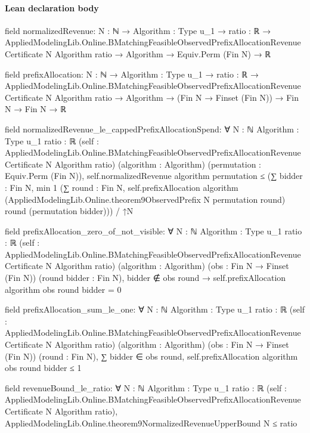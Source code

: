 \documentclass[10pt]{article}
\begin{document}
\paragraph{Lean declaration body}
\begin{ReviewVerbatim}
field normalizedRevenue:
{N : ℕ} →
  {Algorithm : Type u_1} →
    {ratio : ℝ} →
      AppliedModelingLib.Online.BMatchingFeasibleObservedPrefixAllocationRevenueCertificate N Algorithm ratio →
        Algorithm → Equiv.Perm (Fin N) → ℝ

field prefixAllocation:
{N : ℕ} →
  {Algorithm : Type u_1} →
    {ratio : ℝ} →
      AppliedModelingLib.Online.BMatchingFeasibleObservedPrefixAllocationRevenueCertificate N Algorithm ratio →
        Algorithm → (Fin N → Finset (Fin N)) → Fin N → Fin N → ℝ

field normalizedRevenue_le_cappedPrefixAllocationSpend:
∀ {N : ℕ} {Algorithm : Type u_1} {ratio : ℝ}
  (self : AppliedModelingLib.Online.BMatchingFeasibleObservedPrefixAllocationRevenueCertificate N Algorithm ratio)
  (algorithm : Algorithm) (permutation : Equiv.Perm (Fin N)),
  self.normalizedRevenue algorithm permutation ≤
    (∑ bidder : Fin N,
        min 1
          (∑ round : Fin N,
            self.prefixAllocation algorithm (AppliedModelingLib.Online.theorem9ObservedPrefix N permutation round) round
              (permutation bidder))) /
      ↑N

field prefixAllocation_zero_of_not_visible:
∀ {N : ℕ} {Algorithm : Type u_1} {ratio : ℝ}
  (self : AppliedModelingLib.Online.BMatchingFeasibleObservedPrefixAllocationRevenueCertificate N Algorithm ratio)
  (algorithm : Algorithm) (obs : Fin N → Finset (Fin N)) (round bidder : Fin N),
  bidder ∉ obs round → self.prefixAllocation algorithm obs round bidder = 0

field prefixAllocation_sum_le_one:
∀ {N : ℕ} {Algorithm : Type u_1} {ratio : ℝ}
  (self : AppliedModelingLib.Online.BMatchingFeasibleObservedPrefixAllocationRevenueCertificate N Algorithm ratio)
  (algorithm : Algorithm) (obs : Fin N → Finset (Fin N)) (round : Fin N),
  ∑ bidder ∈ obs round, self.prefixAllocation algorithm obs round bidder ≤ 1

field revenueBound_le_ratio:
∀ {N : ℕ} {Algorithm : Type u_1} {ratio : ℝ}
  (self : AppliedModelingLib.Online.BMatchingFeasibleObservedPrefixAllocationRevenueCertificate N Algorithm ratio),
  AppliedModelingLib.Online.theorem9NormalizedRevenueUpperBound N ≤ ratio
\end{ReviewVerbatim}
\end{document}

